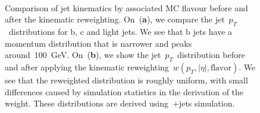 \begin{figure}
\begin{centering}
 \\
\caption[Comparison of jet kinematics in MC simulation by jet flavour]{Comparison of jet kinematics by associated MC flavour before and after the kinematic reweighting. On~(\textbf{a}), we compare the jet~$p_T$~distributions for b, c and light jets. We see that b jets have a momentum distribution that is narrower and peaks around~100~GeV. On~(\textbf{b}), we show the jet~$p_T$~distribution before and after applying the kinematic reweighting~$w(p_T,|\eta|,\mathrm{flavor})$. We see that the reweighted distribution is roughly uniform, with small differences caused by simulation statistics in the derivation of the weight. These distributions are derived using~\ttbar+jets simulation.}
\label{fig:btag_pt_reweight}
\end{centering}
\end{figure}

